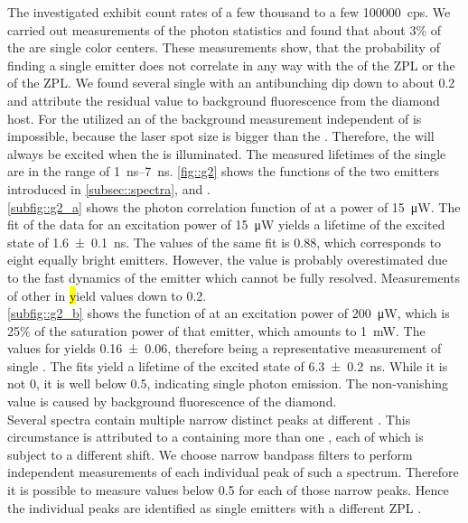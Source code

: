 	The investigated \sivs exhibit count rates of a few thousand to a few \SI{100000}{cps}.
	We carried out measurements of the photon statistics and found that about 3\% of the \sivs are single color centers.
	These measurements show, that the probability of finding a single emitter does not correlate in any way with the \cwl of the ZPL or the \lw of the ZPL.
	We found several single \sivs with an antibunching dip down to about \num{0.2} and attribute the residual \gtz value to background fluorescence from the diamond host.
	For the utilized \nds an of the background measurement independent of \siv \pl is impossible, because the laser spot size is bigger than the \nd. 
	Therefore, the \siv will always be excited when the \nd is illuminated.
	The measured lifetimes of the single \sivs are in the range of \SIrange{1}{7}{ns}.
	\autoref{fig::g2} shows the \gt functions of the two emitters introduced in \autoref{subsec::spectra}, \emnarrow and \embroad.
	\\
	\autoref{subfig::g2_a} shows the photon correlation function of \emnarrow at a power of \SI{15}{\micro\W}. 
	The fit of the data for an excitation power of \SI{15}{\micro\W} yields a lifetime of the excited state of \SI[separate-uncertainty]{1.6\pm0.1}{ns}.
	The \gtz values of the same fit is \num{0.88}, which corresponds to eight equally bright emitters.
	However, the \gtz value is probably overestimated due to the fast dynamics of the emitter which cannot be fully resolved.
	Measurements of other \sivs in \hl yield \gtz values down to \num[separate-uncertainty]{0.2}.
	\\
	\autoref{subfig::g2_b} shows the \gt function of \embroad at an excitation power of \SI{200}{\micro\W}, which is 25\% of the saturation power of that emitter, which amounts to \SI{1}{mW}.
	The \gtz values for yields \num[separate-uncertainty]{0.16\pm0.06}, therefore being a representative \gt measurement of single \sivs.
	The fits yield a lifetime of the excited state of \SI[separate-uncertainty]{6.3\pm0.2}{ns}.
	While it is not 0, it is well below \num{0.5}, indicating single photon emission.
	The non-vanishing \gtz value is caused by background fluorescence of the diamond.
	\\
	Several spectra contain multiple narrow distinct peaks at different \ZPL \cwls.
	This circumstance is attributed to a \nd containing more than one \siv, each of which is subject to a different \cwl shift.
	We choose narrow bandpass filters to perform independent measurements of each individual \siv peak of such a spectrum.
	Therefore it is possible to measure \gtz values below \num{0.5} for each of those narrow peaks.
	Hence the individual peaks are identified as single emitters with a different ZPL \cwl.
	\\
	\begin{figure}[tp]

	\end{figure}

